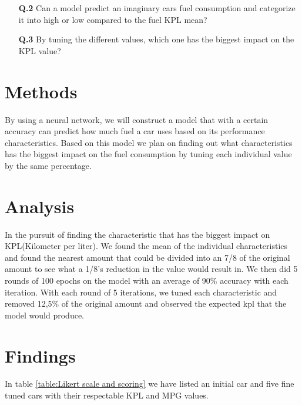 \documentclass[a4paper, twocolumn]{article}
\begin{document}
\begin{itemize}
\item[\textbf{Q.2}]
Can a model predict an imaginary cars fuel consumption and categorize it into high or low compared to the fuel KPL mean?
\end{itemize}

\begin{itemize}
\item[\textbf{Q.3}]
By tuning the different values, which one has the biggest impact on the KPL value?
\end{itemize}



\section{Methods\label{sec:Methods}}


By using a neural network, we will construct a model that with a certain accuracy can predict how much fuel a car uses based on its performance characteristics. Based on this model we plan on finding out what characteristics has the biggest impact on the fuel consumption by tuning each individual value by the same percentage.
\autocite{colab_link}


\section{Analysis\label{sec:Analysis}}

In the pursuit of finding the characteristic that has the biggest impact on KPL(Kilometer per liter). We found the mean of the individual characteristics and found the nearest amount that could be divided  into an 7/8 of the original amount to see what a 1/8's reduction in the value would result in.
We then did 5 rounds of 100 epochs on the model with an average of 90\% accuracy with each iteration. With each round of 5 iterations, we tuned each characteristic and removed 12,5\% of the original amount and observed the expected kpl that the model would produce.
\autocite{githubmodel1}




\section{Findings\label{sec:Findings}}

In table \ref{table:Likert scale and scoring} we have listed an initial car and five fine tuned cars with their respectable KPL and MPG values.
\end{document}
